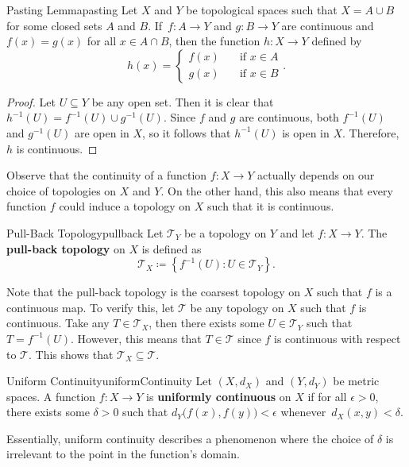 \documentclass[math]{amznotes}
\theoremstyle{remark}
\begin{document}
\begin{lembox}{Pasting Lemma}{pasting}
    Let $X$ and $Y$ be topological spaces such that $X = A \cup B$ for some closed sets $A$ and $B$. If~$f \colon A \to Y$ and $g \colon B \to Y$ are continuous and $f\left(x\right) = g\left(x\right)$ for all $x \in A \cap B$, then the function $h \colon X \to Y$ defined by 
    \begin{equation*}
        h\left(x\right) = \begin{cases}
            f\left(x\right) & \quad\textrm{if } x \in A \\
            g\left(x\right) & \quad\textrm{if } x \in B
        \end{cases}.
    \end{equation*}
    \tcblower
    \begin{proof}
        Let $U \subseteq Y$ be any open set. Then it is clear that $h^{-1}\left(U\right) = f^{-1}\left(U\right) \cup g^{-1}\left(U\right)$. Since $f$ and $g$ are continuous, both $f^{-1}\left(U\right)$ and $g^{-1}\left(U\right)$ are open in $X$, so it follows that $h^{-1}\left(U\right)$ is open in $X$. Therefore, $h$ is continuous.
    \end{proof}
\end{lembox}
Observe that the continuity of a function $f \colon X \to Y$ actually depends on our choice of topologies on $X$ and $Y$. On the other hand, this also means that every function $f$ could induce a topology on $X$ such that it is continuous.
\begin{dfnbox}{Pull-Back Topology}{pullback}
    Let $\mathcal{T}_Y$ be a topology on $Y$ and let $f \colon X \to Y$. The {\color{red} \textbf{pull-back topology}} on $X$ is defined as 
    \begin{equation*}
        \mathcal{T}_X \coloneqq \left\{f^{-1}\left(U\right) \colon U \in \mathcal{T}_Y\right\}.
    \end{equation*}
\end{dfnbox}
Note that the pull-back topology is the coarsest topology on $X$ such that $f$ is a continuous map. To verify this, let $\mathcal{T}$ be any topology on $X$ such that $f$ is continuous. Take any $T \in \mathcal{T}_X$, then there exists some $U \in \mathcal{T}_Y$ such that $T = f^{-1}\left(U\right)$. However, this means that $T \in \mathcal{T}$ since $f$ is continuous with respect to $\mathcal{T}$. This shows that $\mathcal{T}_X \subseteq \mathcal{T}$.
\begin{dfnbox}{Uniform Continuity}{uniformContinuity}
    Let $\left(X, d_X\right)$ and $\left(Y, d_Y\right)$ be metric spaces. A function $f \colon X \to Y$ is {\color{red} \textbf{uniformly continuous}} on $X$ if for all $\epsilon > 0$, there exists some $\delta > 0$ such that $d_Y\bigl(f\left(x\right), f\left(y\right)\bigr) < \epsilon$ whenever~$d_X\left(x, y\right) < \delta$.
\end{dfnbox}
Essentially, uniform continuity describes a phenomenon where the choice of $\delta$ is irrelevant to the point in the function's domain.
\end{document}
